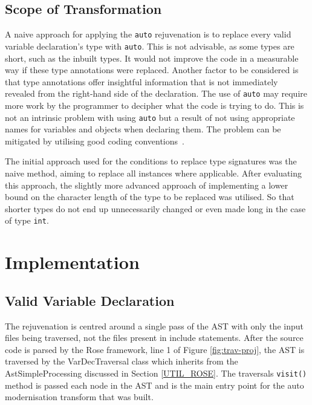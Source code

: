 \documentclass[bsc,frontabs,singlespacing,twoside,parskip,deptreport]{infthesis}
\begin{document}
\subsection{Scope of Transformation}\label{sec:auto-scop-trans}

A naive approach for applying the \texttt{auto} rejuvenation is to replace every valid variable declaration's type with \texttt{auto}. This is not advisable, as some types are short, such as the inbuilt types. It would not improve the code in a measurable way if these type annotations were replaced. Another factor to be considered is that type annotations offer insightful information that is not immediately revealed from the right-hand side of the declaration. The use of \texttt{auto} may require more work by the programmer to decipher what the code is trying to do. This is not an intrinsic problem with using \texttt{auto} but a result of not using appropriate names for variables and objects when declaring them. The problem can be mitigated by utilising good coding conventions~\cite{GOOGLE_CODING_STYLE}. 

The initial approach used for the conditions to replace type signatures was the naive method, aiming to replace all instances where applicable. After evaluating this approach, the slightly more advanced approach of implementing a lower bound on the character length of the type to be replaced was utilised. So that shorter types do not end up unnecessarily changed or even made long in the case of type \texttt{int}.

\section{Implementation}\label{sec:auto-Impl}

\subsection{Valid Variable Declaration}

The rejuvenation is centred around a single pass of the AST with only the input files being traversed, not the files present in include statements. After the source code is parsed by the Rose framework, line 1 of Figure \ref{fig:trav-proj}, the AST is traversed by the VarDecTraversal class which inherits from the AstSimpleProcessing discussed in Section \ref{UTIL_ROSE}. The traversals \texttt{visit()} method is passed each node in the AST and is the main entry point for the auto modernisation transform that was built.
\end{document}
